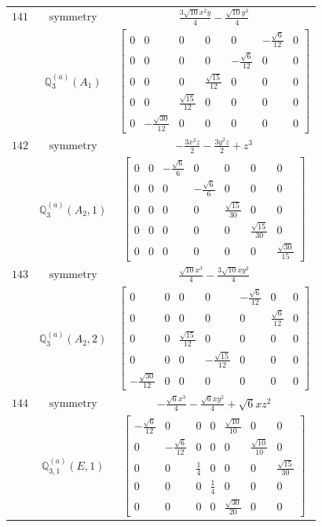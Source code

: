 \documentclass[fleqn,8pt,landscape]{jsarticle}
\begin{document}
\begin{longtable}{ccc}
$ 141 $ & $ \text{symmetry} $ & $ \frac{3 \sqrt{10} x^{2} y}{4} - \frac{\sqrt{10} y^{3}}{4} $ \\
$  $ & $ \mathbb{Q}_{3}^{(a)}(A_{1}) $ & $ \begin{bmatrix} 0 & 0 & 0 & 0 & 0 & - \frac{\sqrt{6}}{12} & 0 \\ 0 & 0 & 0 & 0 & - \frac{\sqrt{6}}{12} & 0 & 0 \\ 0 & 0 & 0 & \frac{\sqrt{15}}{12} & 0 & 0 & 0 \\ 0 & 0 & \frac{\sqrt{15}}{12} & 0 & 0 & 0 & 0 \\ 0 & - \frac{\sqrt{30}}{12} & 0 & 0 & 0 & 0 & 0 \end{bmatrix} $ \\ \hline
$ 142 $ & $ \text{symmetry} $ & $ - \frac{3 x^{2} z}{2} - \frac{3 y^{2} z}{2} + z^{3} $ \\
$  $ & $ \mathbb{Q}_{3}^{(a)}(A_{2},1) $ & $ \begin{bmatrix} 0 & 0 & - \frac{\sqrt{6}}{6} & 0 & 0 & 0 & 0 \\ 0 & 0 & 0 & - \frac{\sqrt{6}}{6} & 0 & 0 & 0 \\ 0 & 0 & 0 & 0 & \frac{\sqrt{15}}{30} & 0 & 0 \\ 0 & 0 & 0 & 0 & 0 & \frac{\sqrt{15}}{30} & 0 \\ 0 & 0 & 0 & 0 & 0 & 0 & \frac{\sqrt{30}}{15} \end{bmatrix} $ \\ \hline
$ 143 $ & $ \text{symmetry} $ & $ \frac{\sqrt{10} x^{3}}{4} - \frac{3 \sqrt{10} x y^{2}}{4} $ \\
$  $ & $ \mathbb{Q}_{3}^{(a)}(A_{2},2) $ & $ \begin{bmatrix} 0 & 0 & 0 & 0 & - \frac{\sqrt{6}}{12} & 0 & 0 \\ 0 & 0 & 0 & 0 & 0 & \frac{\sqrt{6}}{12} & 0 \\ 0 & 0 & \frac{\sqrt{15}}{12} & 0 & 0 & 0 & 0 \\ 0 & 0 & 0 & - \frac{\sqrt{15}}{12} & 0 & 0 & 0 \\ - \frac{\sqrt{30}}{12} & 0 & 0 & 0 & 0 & 0 & 0 \end{bmatrix} $ \\ \hline
$ 144 $ & $ \text{symmetry} $ & $ - \frac{\sqrt{6} x^{3}}{4} - \frac{\sqrt{6} x y^{2}}{4} + \sqrt{6} x z^{2} $ \\
$  $ & $ \mathbb{Q}_{3,1}^{(a)}(E,1) $ & $ \begin{bmatrix} - \frac{\sqrt{6}}{12} & 0 & 0 & 0 & \frac{\sqrt{10}}{10} & 0 & 0 \\ 0 & - \frac{\sqrt{6}}{12} & 0 & 0 & 0 & \frac{\sqrt{10}}{10} & 0 \\ 0 & 0 & \frac{1}{4} & 0 & 0 & 0 & \frac{\sqrt{15}}{30} \\ 0 & 0 & 0 & \frac{1}{4} & 0 & 0 & 0 \\ 0 & 0 & 0 & 0 & \frac{\sqrt{30}}{20} & 0 & 0 \end{bmatrix} $ \\ \hline

\end{longtable}
\end{document}
